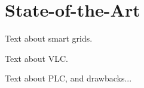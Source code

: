 
\chapter{State-of-the-Art}
\label{chp:state-of-the-art}

Text about smart grids.



Text about VLC.



Text about PLC, and drawbacks...